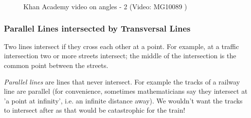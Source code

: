 	\begin{figure}[H] %
    
    
    \textnormal{Khan Academy video on angles - 2}\vspace{.1in} \nopagebreak
  \label{m39370*yt-media2}\label{m39370*yt-video2}
             { (Video:  MG10089 )}
      
      \vspace{2pt}
    \vspace{.1in}
    
    

 \end{figure}   

    \addtocounter{footnote}{-0}
    \par 
      
      \label{m39370*uid28}
            \subsubsection{ Parallel Lines intersected by Transversal Lines}
            \nopagebreak
            \label{m39370*id316211}Two lines intersect if they cross each other at a point. For example, at a traffic intersection two or more streets intersect; the middle of the intersection is the common point between the streets.\par 
        \label{m39370*id316216}\textsl{Parallel lines} are lines that never intersect. For example the tracks of a railway line are parallel (for convenience, sometimes mathematicians say they intersect at 'a point at infinity', i.e. an infinite distance away). We wouldn't want the tracks to intersect after as that would be catastrophic for the train!\par 
        \label{m39370*id316225}
          
    \setcounter{subfigure}{0}


